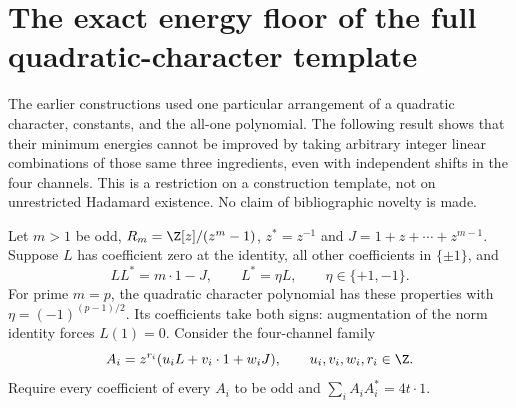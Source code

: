 \section{The exact energy floor of the full quadratic-character template}
The earlier constructions used one particular arrangement of a quadratic
character, constants, and the all-one polynomial. The following result
shows that their minimum energies cannot be improved by taking arbitrary
integer linear combinations of those same three ingredients, even with
independent shifts in the four channels. This is a restriction on a
construction template, not on unrestricted Hadamard existence. No claim
of bibliographic novelty is made.

Let $m>1$ be odd, $R_m=\Z[z]/(z^m-1)$, $z^*=z^{-1}$ and
$J=1+z+\cdots+z^{m-1}$. Suppose $L$ has coefficient zero at the
identity, all other coefficients in $\{\pm1\}$, and
\[
 LL^*=m\cdot1-J,\qquad L^*=\eta L,\qquad \eta\in\{+1,-1\}.
\]
For prime $m=p$, the quadratic character polynomial has these
properties with $\eta=(-1)^{(p-1)/2}$. Its coefficients take both signs:
augmentation of the norm identity forces $L(1)=0$.
Consider the four-channel family
\begin{equation}\label{eq:fullspan}
 A_i=z^{r_i}(u_iL+v_i\cdot1+w_iJ),\qquad
 u_i,v_i,w_i,r_i\in\Z.
\end{equation}
Require every coefficient of every $A_i$ to be odd and
$\sum_iA_iA_i^*=4t\cdot1$.


